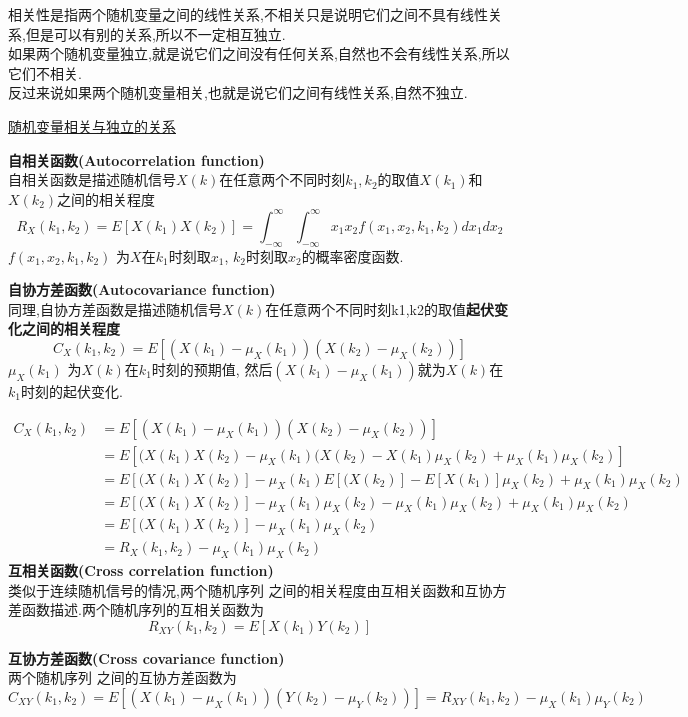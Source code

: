 相关性是指两个随机变量之间的线性关系,不相关只是说明它们之间不具有线性关系,但是可以有别的关系,所以不一定相互独立.\\
如果两个随机变量独立,就是说它们之间没有任何关系,自然也不会有线性关系,所以它们不相关.\\
反过来说如果两个随机变量相关,也就是说它们之间有线性关系,自然不独立.

\href{http://www.cppblog.com/sosi/archive/2010/09/20/127151.html}{随机变量相关与独立的关系}

\textbf{自相关函数(Autocorrelation function)}\\
自相关函数是描述随机信号$X(k)$在任意两个不同时刻$k_1,k_2$的取值$X(k_1) $和$X(k_2) $之间的相关程度
$$
R_X(k_1, k_2)
= E[X(k_1) X(k_2)]
= \int_{-\infty}^{\infty} \int_{-\infty}^{\infty} x_1 x_2 f(x_1, x_2, k_1, k_2)dx_1 dx_2
$$
$f(x_1, x_2, k_1, k_2)$ 为$X$在$k_1$时刻取$x_1$, $k_2$时刻取$x_2$的概率密度函数.

\textbf{自协方差函数(Autocovariance function)}\\
同理,自协方差函数是描述随机信号$X(k)$在任意两个不同时刻k1,k2的取值\textbf{起伏变化之间的相关程度}
$$ C_X(k_1,k_2) = E[(X(k_1) - \mu_X(k_1)) (X(k_2) - \mu_X(k_2))] $$
$\mu_X(k_1)$ 为$X(k)$在$k_1$时刻的预期值, 然后$(X(k_1) - \mu_X(k_1))$就为$X(k)$在$k_1$时刻的起伏变化.

$$
\begin{aligned}
C_X(k_1,k_2)
& = E[(X(k_1) - \mu_X(k_1)) (X(k_2) - \mu_X(k_2))] \\
& = E[(X(k_1) X(k_2) - \mu_X(k_1)(X(k_2) - X(k_1)\mu_X(k_2) + \mu_X(k_1) \mu_X(k_2)] \\
& = E[(X(k_1) X(k_2)] - \mu_X(k_1)E[(X(k_2)] - E[X(k_1)]\mu_X(k_2) + \mu_X(k_1) \mu_X(k_2) \\
& = E[(X(k_1) X(k_2)] - \mu_X(k_1) \mu_X(k_2) - \mu_X(k_1) \mu_X(k_2) + \mu_X(k_1) \mu_X(k_2) \\
& = E[(X(k_1) X(k_2)] - \mu_X(k_1) \mu_X(k_2)\\
& = R_X(k_1, k_2) - \mu_X(k_1) \mu_X(k_2)
\end{aligned}
$$
\textbf{互相关函数(Cross correlation function)}\\
类似于连续随机信号的情况,两个随机序列 之间的相关程度由互相关函数和互协方差函数描述.两个随机序列的互相关函数为
$$ R_{XY}(k_1, k_2) = E[X(k_1) Y(k_2)]$$

\textbf{互协方差函数(Cross covariance function)}\\
两个随机序列 之间的互协方差函数为
$$ C_{XY}(k_1,k_2) = E[(X(k_1) - \mu_X(k_1)) (Y(k_2) - \mu_Y(k_2))] = R_{XY}(k_1,k_2) - \mu_X(k_1) \mu_Y(k_2) $$

